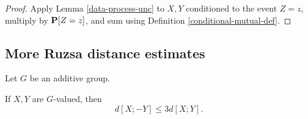 \begin{proof}  Apply Lemma \ref{data-process-unc} to $X,Y$ conditioned to the event $Z=z$, multiply by ${\bf P}[Z=z]$, and sum using Definition \ref{conditional-mutual-def}.
\end{proof}

\subsection{More Ruzsa distance estimates}

Let $G$ be an additive group.

\begin{lemma}\label{sign-flip}
  If $X,Y$ are $G$-valued, then
  $$  d[X ; -Y]  \leq 3 d[X;Y].$$
\end{lemma}

